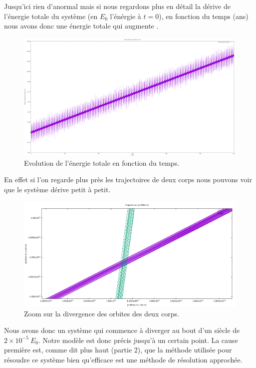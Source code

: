 \documentclass[a4paper]{article}
\begin{document}
Jusqu'ici rien d'anormal mais si nous regardons plus en détail la dérive de l'énergie totale du système (en $E_0$ l'énérgie à $t = 0$), en fonction du temps (ans) nous avons donc une énergie totale qui augmente .

\begin{figure}[h]
\centering
\includegraphics[width=\textwidth]{Der.png}
\caption{Evolution de l'énergie totale en fonction du temps.}
\end{figure}

En effet si l'on regarde plus près les trajectoires de deux corps nous pouvons voir que le système dérive petit à petit.

\begin{figure}[h]
\centering
\includegraphics[width=\textwidth]{3.png}
\caption{Zoom sur la divergence des orbites des deux corps.}
\end{figure}

Nous avons donc un système qui commence à diverger au bout d'un siècle de $2 \times 10^{-5}~E_0$. Notre modèle est donc précis jusqu'à un certain point. La cause première est, comme dit plus haut (partie 2), que la méthode utilisée pour résoudre ce système bien qu'efficace est une méthode de résolution approchée.
\end{document}
